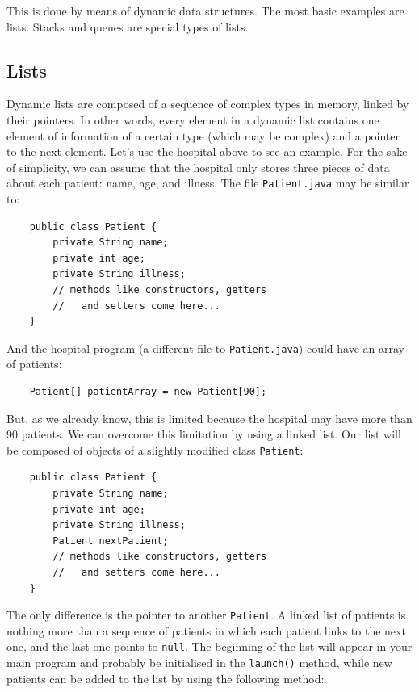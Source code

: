 This is done by means of dynamic data structures. The most basic
examples are lists. Stacks and queues are special types of lists. 

\subsection{Lists}
\label{sec:lists}

Dynamic lists are composed of a sequence of complex types in memory,
linked by their pointers. In other words, every element in a dynamic
list contains one element of information of a certain type (which may
be complex) and a pointer to the next element. Let's use the hospital
above to see an example. For the sake of simplicity, we can assume
that the hospital only stores three pieces of data about each patient:
name, age, and illness. The file \verb+Patient.java+ may be similar to:

\begin{verbatim}
    public class Patient {
        private String name;
        private int age;
        private String illness;
        // methods like constructors, getters 
        //   and setters come here...
    }
\end{verbatim}

And the hospital program (a different file to \verb+Patient.java+)
could have an array of patients:  

\begin{verbatim}
    Patient[] patientArray = new Patient[90];
\end{verbatim}

But, as we already know, this is limited because the hospital may have
more than 90 patients. We can overcome this limitation by using a
linked list. Our list will be composed of objects of a slightly
modified class \verb+Patient+:

\begin{verbatim}
    public class Patient {
        private String name;
        private int age;
        private String illness;
        Patient nextPatient;
        // methods like constructors, getters 
        //   and setters come here...
    }
\end{verbatim}

The only difference is the pointer to another \verb+Patient+. A linked
list of patients is nothing more than a sequence of patients in which
each patient links to the next one, and the last one 
points to \verb+null+. The beginning of the list will
appear in your main program and probably be initialised in the
\verb+launch()+ method, while new patients can be added to the list by
using the following method: 

